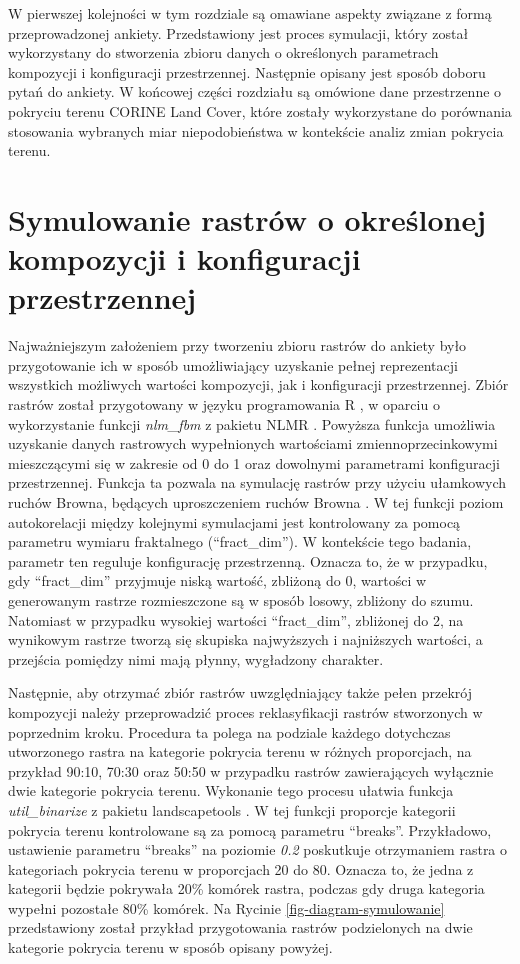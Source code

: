 \documentclass{amuthesis}
\begin{document}
W pierwszej kolejności w tym rozdziale są omawiane aspekty związane z
formą przeprowadzonej ankiety. Przedstawiony jest proces symulacji,
który został wykorzystany do stworzenia zbioru danych o określonych
parametrach kompozycji i konfiguracji przestrzennej. Następnie opisany
jest sposób doboru pytań do ankiety. W końcowej części rozdziału są
omówione dane przestrzenne o pokryciu terenu CORINE Land Cover, które
zostały wykorzystane do porównania stosowania wybranych miar
niepodobieństwa w kontekście analiz zmian pokrycia terenu.

\hypertarget{sec-symulowanie}{%
\section{Symulowanie rastrów o określonej kompozycji i konfiguracji
przestrzennej}\label{sec-symulowanie}}

Najważniejszym założeniem przy tworzeniu zbioru rastrów do ankiety było
przygotowanie ich w sposób umożliwiający uzyskanie pełnej reprezentacji
wszystkich możliwych wartości kompozycji, jak i konfiguracji
przestrzennej. Zbiór rastrów został przygotowany w języku programowania
R \autocite{R2023}, w oparciu o wykorzystanie funkcji \emph{nlm\_fbm} z
pakietu NLMR \autocite{NLMR2018}. Powyższa funkcja umożliwia uzyskanie
danych rastrowych wypełnionych wartościami zmiennoprzecinkowymi
mieszczącymi się w zakresie od 0 do 1 oraz dowolnymi parametrami
konfiguracji przestrzennej. Funkcja ta pozwala na symulację rastrów przy
użyciu ułamkowych ruchów Browna, będących uproszczeniem ruchów Browna
\autocite{nlm_fbm}. W tej funkcji poziom autokorelacji między kolejnymi
symulacjami jest kontrolowany za pomocą parametru wymiaru fraktalnego
(``fract\_dim''). W kontekście tego badania, parametr ten reguluje
konfigurację przestrzenną. Oznacza to, że w przypadku, gdy
``fract\_dim'' przyjmuje niską wartość, zbliżoną do 0, wartości w
generowanym rastrze rozmieszczone są w sposób losowy, zbliżony do szumu.
Natomiast w przypadku wysokiej wartości ``fract\_dim'', zbliżonej do 2,
na wynikowym rastrze tworzą się skupiska najwyższych i najniższych
wartości, a przejścia pomiędzy nimi mają płynny, wygładzony charakter.

Następnie, aby otrzymać zbiór rastrów uwzględniający także pełen
przekrój kompozycji należy przeprowadzić proces reklasyfikacji rastrów
stworzonych w poprzednim kroku. Procedura ta polega na podziale każdego
dotychczas utworzonego rastra na kategorie pokrycia terenu w różnych
proporcjach, na przykład 90:10, 70:30 oraz 50:50 w przypadku rastrów
zawierających wyłącznie dwie kategorie pokrycia terenu. Wykonanie tego
procesu ułatwia funkcja \emph{util\_binarize} z pakietu landscapetools
\autocite{NLMR2018}. W tej funkcji proporcje kategorii pokrycia terenu
kontrolowane są za pomocą parametru ``breaks''. Przykładowo, ustawienie
parametru ``breaks'' na poziomie \emph{0.2} poskutkuje otrzymaniem
rastra o kategoriach pokrycia terenu w proporcjach 20 do 80. Oznacza to,
że jedna z kategorii będzie pokrywała 20\% komórek rastra, podczas gdy
druga kategoria wypełni pozostałe 80\% komórek. Na Rycinie
\ref{fig-diagram-symulowanie} przedstawiony został przykład
przygotowania rastrów podzielonych na dwie kategorie pokrycia terenu w
sposób opisany powyżej.
\end{document}
